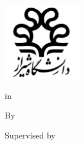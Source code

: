 \begin{titlepage}
    \begin{latin}
        \centering\bfseries
        \includegraphics[width=0.25\textwidth]{images/shiraz_university_logo.pdf}

        {\latinuniversity}

        \vspace{\baselineskip}
        {\latindepartment}

        {\latindegree} {\latintype} in \\ {\latinfield}

        \vspace{3\baselineskip}
        {\Large \latintitle}

        \vspace{3\baselineskip}
        By \\
        {\large \latinname}

        \vspace{2\baselineskip}
        Supervised by \\
        {\large \latinsupervisor}

        \vspace{\baselineskip}
        {\latindate}
    \end{latin}
\end{titlepage}
